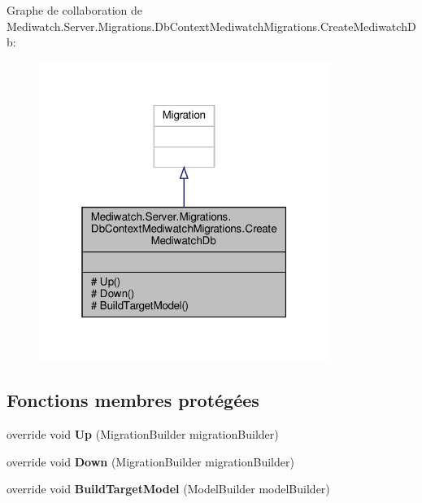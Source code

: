 Graphe de collaboration de Mediwatch.\+Server.\+Migrations.\+Db\+Context\+Mediwatch\+Migrations.\+Create\+Mediwatch\+Db\+:\nopagebreak
\begin{figure}[H]
\begin{center}
\leavevmode
\includegraphics[width=268pt]{class_mediwatch_1_1_server_1_1_migrations_1_1_db_context_mediwatch_migrations_1_1_create_mediwatch_db__coll__graph}
\end{center}
\end{figure}
\subsection*{Fonctions membres protégées}
\begin{DoxyCompactItemize}
\item 
\mbox{\label{class_mediwatch_1_1_server_1_1_migrations_1_1_db_context_mediwatch_migrations_1_1_create_mediwatch_db_aea17f6e8d7935f5a0bfb038903fec64a}} 
override void {\bfseries Up} (Migration\+Builder migration\+Builder)
\item 
\mbox{\label{class_mediwatch_1_1_server_1_1_migrations_1_1_db_context_mediwatch_migrations_1_1_create_mediwatch_db_a055a6d2d32482bd9266d1027a621c37d}} 
override void {\bfseries Down} (Migration\+Builder migration\+Builder)
\item 
\mbox{\label{class_mediwatch_1_1_server_1_1_migrations_1_1_db_context_mediwatch_migrations_1_1_create_mediwatch_db_a57e6a29d0df03daabc564d7e74d20dc2}} 
override void {\bfseries Build\+Target\+Model} (Model\+Builder model\+Builder)
\end{DoxyCompactItemize}



